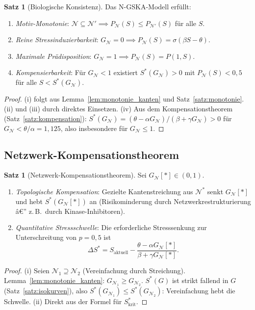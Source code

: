 ﻿\documentclass[12pt, a4paper]{article}
\theoremstyle{definition}
\newtheorem{satz}[definition]{Satz}
\theoremstyle{remark}
\newcommand{\calN}{\mathcal{N}}
\newcommand{\GN}{G_{\calN}}
\begin{document}
\begin{satz}[Biologische Konsistenz]
\label{satz:konsistenz}
Das N-GSKA-Modell erfüllt:
\begin{enumerate}[label=(\roman*)]
  \item \emph{Motiv-Monotonie}: $\calN \subseteq \calN' \implies
    P_\calN(S) \leq P_{\calN'}(S)$ für alle $S$.
  \item \emph{Reine Stressinduzierbarkeit}: $\GN = 0 \implies
    P_\calN(S) = \sigma(\beta S - \theta)$.
  \item \emph{Maximale Prädisposition}: $\GN = 1 \implies
    P_\calN(S) = P(1,S)$.
  \item \emph{Kompensierbarkeit}: Für $\GN < 1$ existiert
    $S^*(\GN) > 0$ mit $P_\calN(S) < 0{,}5$ für alle $S < S^*(\GN)$.
\end{enumerate}
\end{satz}

\begin{proof}
(i) folgt aus Lemma~\ref{lem:monotonie_kanten} und Satz~\ref{satz:monotonie}.
(ii) und (iii) durch direktes Einsetzen.
(iv) Aus dem Kompensationstheorem (Satz~\ref{satz:kompensation}):
$S^*(\GN) = (\theta - \alpha\GN)/(\beta + \gamma\GN) > 0$
für $\GN < \theta/\alpha = 1{,}125$, also insbesondere für $\GN \leq 1$.
\end{proof}

\subsection{Netzwerk-Kompensationstheorem}

\begin{satz}[Netzwerk-Kompensationstheorem]
\label{satz:netzwerk_kompensation}
Sei $\GN[*] \in (0,1)$.
\begin{enumerate}[label=(\roman*)]
  \item \emph{Topologische Kompensation}: Gezielte Kantenstreichung aus $\calN^*$
    senkt $\GN[*]$ und hebt $S^*(\GN[*])$ an (Risikominderung durch
    Netzwerkrestrukturierung â€” z.\,B.\ durch Kinase-Inhibitoren).
  \item \emph{Quantitative Stressschwelle}: Die erforderliche Stresssenkung zur
    Unterschreitung von $p=0{,}5$ ist
    \[
      \Delta S^* = S_{\mathrm{aktuell}} - \frac{\theta - \alpha\GN[*]}{\beta + \gamma\GN[*]}.
    \]
\end{enumerate}
\end{satz}

\begin{proof}
(i) Seien $\calN_1 \supseteq \calN_2$ (Vereinfachung durch Streichung).
Lemma~\ref{lem:monotonie_kanten}: $G_{\calN_1} \geq G_{\calN_2}$.
$S^*(G)$ ist strikt fallend in $G$ (Satz~\ref{satz:isokurven}), also
$S^*(G_{\calN_1}) \leq S^*(G_{\calN_2})$: Vereinfachung hebt die Schwelle.
(ii) Direkt aus der Formel für $S^*_{\mathrm{krit}}$.
\end{proof}
\end{document}
